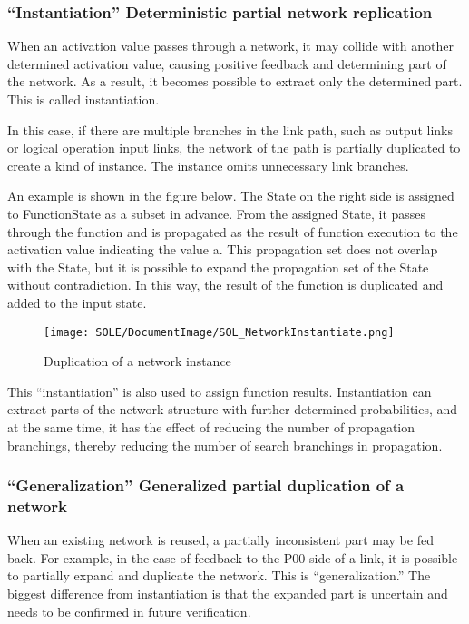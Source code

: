 \documentclass[12pt]{article}
\begin{document}
\subsubsection{``Instantiation'' Deterministic partial network
replication}\label{instantiation-deterministic-partial-network-replication}

When an activation value passes through a network, it may collide with
another determined activation value, causing positive feedback and
determining part of the network. As a result, it becomes possible to
extract only the determined part. This is called instantiation.

In this case, if there are multiple branches in the link path, such as
output links or logical operation input links, the network of the path
is partially duplicated to create a kind of instance. The instance omits
unnecessary link branches.

An example is shown in the figure below. The State on the right side is
assigned to FunctionState as a subset in advance. From the assigned
State, it passes through the function and is propagated as the result of
function execution to the activation value indicating the value a. This
propagation set does not overlap with the State, but it is possible to
expand the propagation set of the State without contradiction. In this
way, the result of the function is duplicated and added to the input
state.

\begin{figure}[ht]
  \centering
  \texttt{[image: SOLE/DocumentImage/SOL\_NetworkInstantiate.png]}
  \caption{Duplication of a network instance}
  \label{fig:duplication_of_a_network_instance}
\end{figure}

This ``instantiation'' is also used to assign function results.
Instantiation can extract parts of the network structure with further
determined probabilities, and at the same time, it has the effect of
reducing the number of propagation branchings, thereby reducing the
number of search branchings in propagation.

\subsubsection{``Generalization'' Generalized partial duplication
of a
network}\label{generalization-generalized-partial-duplication-of-a-network}

When an existing network is reused, a partially inconsistent part may be
fed back. For example, in the case of feedback to the P00 side of a
link, it is possible to partially expand and duplicate the network. This
is ``generalization.'' The biggest difference from instantiation is that
the expanded part is uncertain and needs to be confirmed in future
verification.
\end{document}
